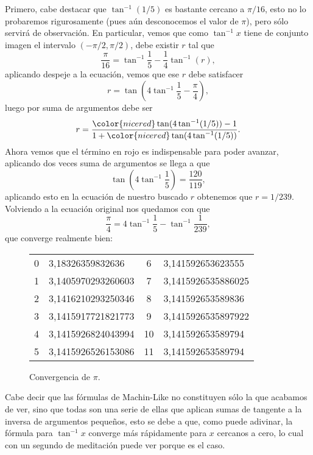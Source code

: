 \documentclass[11pt,oneside,a4paper]{book}
\begin{document}
Primero, cabe destacar que $\tan^{-1}(1/5)$ es bastante cercano a $\pi/16$, esto no lo probaremos rigurosamente (pues aún desconocemos el valor de $\pi$), pero sólo servirá de observación. En particular, vemos que como $\tan^{-1}x$ tiene de conjunto imagen el intervalo $(-\pi/2,\pi/2)$, debe existir $r$ tal que
$$\frac{\pi}{16}=\tan^{-1}\frac{1}{5}-\frac{1}{4}\tan^{-1}(r),$$
aplicando despeje a la ecuación, vemos que ese $r$ debe satisfacer
$$r=\tan\left(4\tan^{-1}\frac{1}{5}-\frac{\pi}{4}\right),$$
luego por suma de argumentos debe ser
$$r=\frac{{\color{nicered}\tan(4\tan^{-1}(1/5))}-1}{1+{\color{nicered}\tan(4\tan^{-1}(1/5))}}.$$
Ahora vemos que el término en rojo es indispensable para poder avanzar, aplicando dos veces suma de argumentos se llega a que
$$\tan\left(4\tan^{-1}\frac 15\right)=\frac{120}{119},$$
aplicando esto en la ecuación de nuestro buscado $r$ obtenemos que $r=1/239$. Volviendo a la ecuación original nos quedamos con que
$$\frac{\pi}{4}=4\tan^{-1}\frac{1}{5}-\tan^{-1}\frac{1}{239},$$
que converge realmente bien:
\begin{figure}
\centering
\begin{tabular}{|cl|cl|}
0 & 3,18326359832636 & 6 & 3,141592653623555 \\
1 & 3,1405970293260603 & 7 & 3,1415926535886025 \\
2 & 3,1416210293250346 & 8 & 3,141592653589836 \\
3 & 3,1415917721821773 & 9 & 3,1415926535897922 \\
4 & 3,1415926824043994 & 10 & 3,141592653589794 \\
5 & 3,1415926526153086 & 11 & 3,141592653589794
\end{tabular}
\caption{Convergencia de $\pi$.}
\end{figure}

Cabe decir que las fórmulas de Machin-Like no constituyen sólo la que acabamos de ver, sino que todas son una serie de ellas que aplican sumas de tangente a la inversa de argumentos pequeños, esto se debe a que, como puede adivinar, la fórmula para $\tan^{-1}x$ converge más rápidamente para $x$ cercanos a cero, lo cual con un segundo de meditación puede ver porque es el caso.
\end{document}
